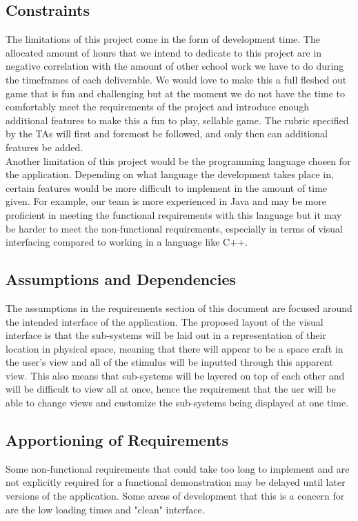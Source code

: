 \documentclass[12pt, titlepage]{article}
\begin{document}
\subsection{Constraints}
The limitations of this project come in the form of development time. The allocated amount of hours that we intend to dedicate to this project are in negative correlation with the amount of other school work we have to do during the timeframes of each deliverable. We would love to make this a full fleshed out game that is fun and challenging but at the moment we do not have the time to comfortably meet the requirements of the project and introduce enough additional features to make this a fun to play, sellable game. The rubric specified by the TAs will first and foremost be followed, and only then can additional features be added.
\\Another limitation of this project would be the programming language chosen for the application. Depending on what language the development takes place in, certain features would be more difficult to implement in the amount of time given. For example, our team is more experienced in Java and may be more proficient in meeting the functional requirements with this language but it may be harder to meet the non-functional requirements, especially in terms of visual interfacing compared to working in a language like C++.

\subsection{Assumptions and Dependencies}
The assumptions in the requirements section of this document are focused around the intended interface of the application. The proposed layout of the visual interface is that the sub-systems will be laid out in a representation of their location in physical space, meaning that there will appear to be a space craft in the user's view and all of the stimulus will be inputted through this apparent view. This also means that sub-systems will be layered on top of each other and will be difficult to view all at once, hence the requirement that the uer will be able to change views and customize the sub-systems being displayed at one time.

\subsection{Apportioning of Requirements}
Some non-functional requirements that could take too long to implement and are not explicitly required for a functional demonstration may be delayed until later versions of the application. Some areas of development that this is a concern for are the low loading times and "clean" interface.
\end{document}
